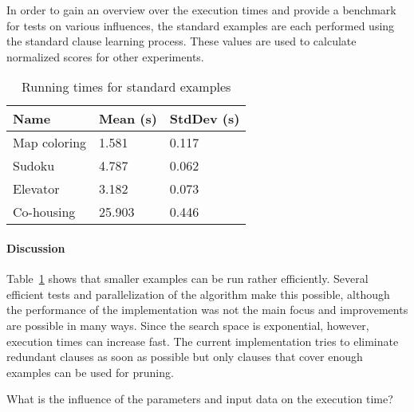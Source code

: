 \begin{experiment}
\label{exp:benchmark}
	In order to gain an overview over the execution times and provide a benchmark for tests on various influences, the standard examples are each performed using the standard clause learning process.
	These values are used to calculate normalized scores for other experiments.
	
	\begin{table}[!htp]
		\begin{tabularx}{\textwidth}{XXX}
			\textbf{Name}	& \textbf{Mean (s)}	& \textbf{StdDev (s)} \\
			\toprule
			Map coloring 	& 1.581				& 0.117 \\
			Sudoku 			& 4.787				& 0.062 \\
			Elevator 		& 3.182 			& 0.073 \\
			Co-housing 		& 25.903			& 0.446
		\end{tabularx}
		\caption{Running times for standard examples}
		\label{tbl:exp_speed_standard}
	\end{table}

\end{experiment}

\paragraph{Discussion}
Table~\ref{tbl:exp_speed_standard} shows that smaller examples can be run rather efficiently.
Several efficient tests and parallelization of the algorithm make this possible, although the performance of the implementation was not the main focus and improvements are possible in many ways.
Since the search space is exponential, however, execution times can increase fast.
The current implementation tries to eliminate redundant clauses as soon as possible but only clauses that cover enough examples can be used for pruning.

\begin{question}
	What is the influence of the parameters and input data on the execution time?
\end{question}

